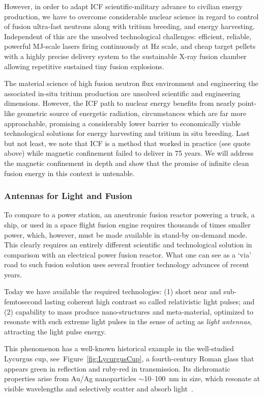 \documentclass[particles,article,accept,pdftex,moreauthors]{Definitions/mdpi}
\begin{document}
However, in order to adapt ICF scientific-military advance to civilian energy production, we have to overcome considerable nuclear science in regard to control of fusion ultra-fast neutrons along with tritium breeding, and energy harvesting. Independent of this are the unsolved technological challenges: efficient, reliable, powerful MJ-scale lasers firing continuously at Hz scale, and cheap target pellets with a highly precise delivery system to the sustainable X-ray fusion chamber allowing repetitive sustained tiny fusion explosions.

The material science of high fusion neutron flux environment and engineering the associated in-situ tritium production are unsolved scientific and engineering dimensions. However, the ICF path to nuclear energy benefits from nearly point-like geometric source of energetic radiation, circumstances which are far more approachable, promising a considerably lower barrier to economically viable technological solutions for energy harvesting and tritium in situ breeding. Last but not least, we note that ICF is a method that worked in practice (see quote above) while magnetic confinement failed to deliver in 75 years. We will address the magnetic confinement in depth and show that the promise of infinite clean fusion energy in this context is untenable.

\subsubsection{Antennas for Light and Fusion}\label{sssec:nanoF}
To compare to a power station, an aneutronic fusion reactor powering a truck, a ship, or used in a space flight fusion engine requires thousands of times smaller power, which, however, must be made available in stand-by on-demand mode. This clearly requires an entirely different scientific and technological solution in comparison with an electrical power fusion reactor. What one can see as a `via' road to such fusion solution uses several frontier technology advances of recent years. 

Today we have available the required technologies: (1) short near and sub-femtosecond lasting coherent high contrast so called relativistic light pulses; and (2) capability to mass produce nano-structures and meta-material, optimized to resonate with such extreme light pulses in the sense of acting as {\em light antennas}, attracting the light pulse energy.

This phenomenon has a well-known historical example in the well-studied Lycurgus cup, see~Figure~\ref{fig:LycurgusCup}, a fourth-century Roman glass that appears green in reflection and ruby-red in transmission. Its dichromatic properties arise from Au/Ag nanoparticles $\sim$10--100~nm in size, which resonate at visible wavelengths and selectively scatter and absorb light~\cite{freestone2007lycurgus}. 
\end{document}
